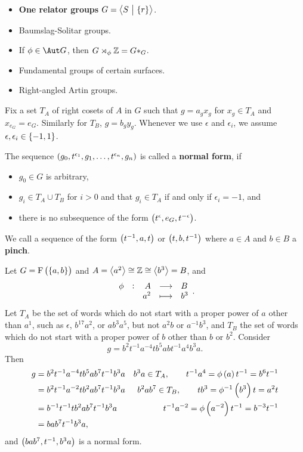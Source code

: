 \begin{example}
\hfill
\begin{itemize}
\item \textbf{One relator groups} $ G = \abr{S \st \cbr{r}} $.
\item Baumslag-Solitar groups.
\item If $ \phi \in \Aut G $, then $ G \rtimes_\phi \mathbb{Z} = G *_G $.
\item Fundamental groups of certain surfaces.
\item Right-angled Artin groups.
\end{itemize}
\end{example}

Fix a set $ T_A $ of right cosets of $ A $ in $ G $ such that $ g = a_gx_g $ for $ x_g \in T_A $ and $ x_{e_G} = e_G $. Similarly for $ T_B $, $ g = b_gy_g $. Whenever we use $ \epsilon $ and $ \epsilon_i $, we assume $ \epsilon, \epsilon_i \in \cbr{-1, 1} $.

\begin{definition}
The sequence $ \br{g_0, t^{\epsilon_1}, g_1, \dots, t^{\epsilon_n}, g_n} $ is called a \textbf{normal form}, if
\begin{itemize}
\item $ g_0 \in G $ is arbitrary,
\item $ g_i \in T_A \cup T_B $ for $ i > 0 $ and that $ g_i \in T_A $ if and only if $ \epsilon_i = -1 $, and
\item there is no subsequence of the form $ \br{t^\epsilon, e_G, t^{-\epsilon}} $.
\end{itemize}
We call a sequence of the form $ \br{t^{-1}, a, t} $ or $ \br{t, b, t^{-1}} $ where $ a \in A $ and $ b \in B $ a \textbf{pinch}.
\end{definition}

\begin{example}
Let $ G = \F\br{\cbr{a, b}} $ and $ A = \left\langle a^2 \right\rangle \cong \mathbb{Z} \cong \left\langle b^3 \right\rangle = B $, and
$$ \function[\phi]{A}{B}{a^2}{b^3}. $$
Let $ T_A $ be the set of words which do not start with a proper power of $ a $ other than $ a^1 $, such as $ \epsilon $, $ b^{17}a^2 $, or $ ab^3a^5 $, but not $ a^2b $ or $ a^{-1}b^3 $, and $ T_B $ the set of words which do not start with a proper power of $ b $ other than $ b $ or $ b^2 $. Consider
$$ g = b^2t^{-1}a^{-4}tb^5abt^{-1}a^4b^3a. $$
Then
\begin{align*}
g
& = b^2t^{-1}a^{-4}tb^5ab^7t^{-1}b^3a & b^3a \in T_A, \qquad t^{-1}a^4 = \phi\br{a}t^{-1} = b^6t^{-1} \\
& = b^2t^{-1}a^{-2}tb^2ab^7t^{-1}b^3a & b^2ab^7 \in T_B, \qquad tb^3 = \phi^{-1}\br{b^3}t = a^2t \\
& = b^{-1}t^{-1}tb^2ab^7t^{-1}b^3a & t^{-1}a^{-2} = \phi\br{a^{-2}}t^{-1} = b^{-3}t^{-1} \\
& = bab^7t^{-1}b^3a,
\end{align*}
and $ \br{bab^7, t^{-1}, b^3a} $ is a normal form.
\end{example}

